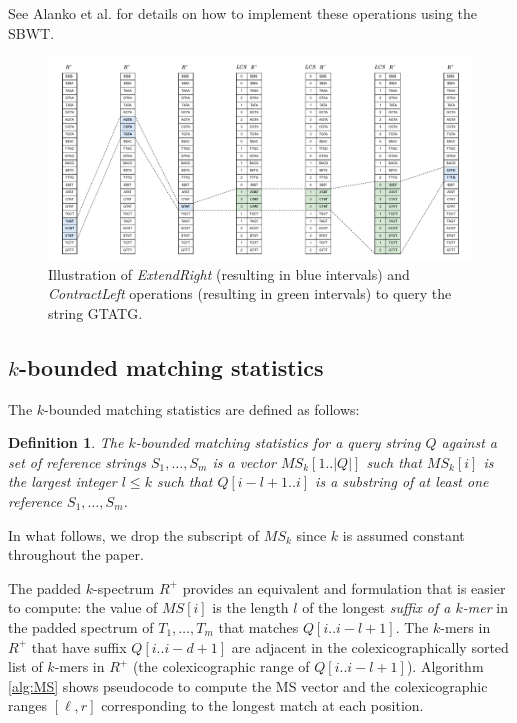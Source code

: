 \documentclass[unnumsec,webpdf,contemporary,large]{oup-authoring-template}%
\theoremstyle{thmstyleone}%
\theoremstyle{thmstyletwo}%
\theoremstyle{thmstylethree}%
\newtheorem{definition}{Definition}
\begin{document}
See Alanko et al. \cite{alanko2024finimizers} for details on how to implement these operations using the SBWT.

\begin{figure}
    \centering
    \includegraphics[scale=0.6]{fig/SBWT_search_LCS.drawio.pdf}
    \caption{Illustration of {\em ExtendRight} (resulting in blue intervals) and {\em ContractLeft} operations (resulting in green intervals) to query the string {\sf GTATG}.}
    \label{fig:sbwt-search}
\end{figure}

\subsection{\texorpdfstring{$k$-bounded matching statistics}{k-bounded matching statistics}}

The $k$-bounded matching statistics are defined as follows:

\begin{definition}\label{def:k-bounded-ms}
    The $k$-bounded matching statistics for a query string $Q$ against a set of reference strings $S_1, \ldots, S_m$ is a vector $MS_k[1..|Q|]$ such that $MS_k[i]$ is the largest integer $l \leq k$ such that $Q[i-l+1..i]$ %
    is a substring of at least one reference $S_1, \ldots, S_m$.
\end{definition}

In what follows, we drop the subscript of $MS_k$ since $k$ is assumed constant throughout the paper.

The padded $k$-spectrum $R^+$ provides an equivalent and formulation that is easier to compute: the value of $MS[i]$ is the length $l$ of the longest \emph{suffix of a $k$-mer} in the padded spectrum of $T_1, \ldots, T_m$ that matches $Q[i..i-l+1]$. The $k$-mers in $R^+$ that have suffix $Q[i..i-d+1]$ are adjacent in the colexicographically sorted list of $k$-mers in $R^+$ (the colexicographic range of $Q[i..i-l+1]$). Algorithm \ref{alg:MS} shows pseudocode to compute the MS vector and the colexicographic ranges $[\ell, r]$ corresponding to the longest match at each position.
\end{document}
